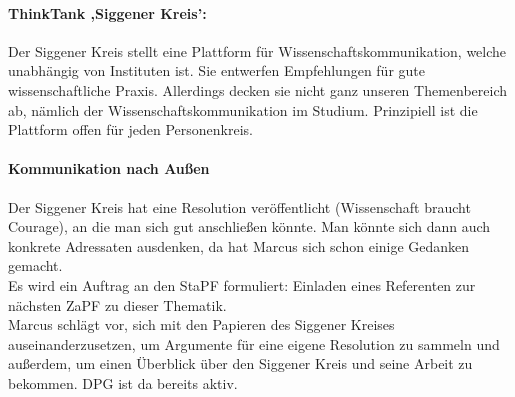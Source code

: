     \paragraph{ThinkTank ,Siggener Kreis’:}
      Der Siggener Kreis stellt eine Plattform für Wissenschaftskommunikation, welche unabhängig von Instituten ist.
      Sie entwerfen Empfehlungen für gute wissenschaftliche Praxis. Allerdings decken sie nicht ganz unseren Themenbereich ab, nämlich der Wissenschaftskommunikation im Studium.
      Prinzipiell ist die Plattform offen für jeden Personenkreis.

    \paragraph{Kommunikation nach Außen}
      Der Siggener Kreis hat eine Resolution veröffentlicht (Wissenschaft braucht Courage), an die man sich gut anschließen könnte.
      Man könnte sich dann auch konkrete Adressaten ausdenken, da hat Marcus sich schon einige Gedanken gemacht. \\

      Es wird ein Auftrag an den StaPF formuliert: Einladen eines Referenten zur nächsten ZaPF zu dieser Thematik. \\

      Marcus schlägt vor, sich mit den Papieren des Siggener Kreises auseinanderzusetzen, um Argumente für eine eigene
      Resolution zu sammeln und außerdem, um einen Überblick über den Siggener Kreis und seine Arbeit zu bekommen.
      DPG ist da bereits aktiv. \\


